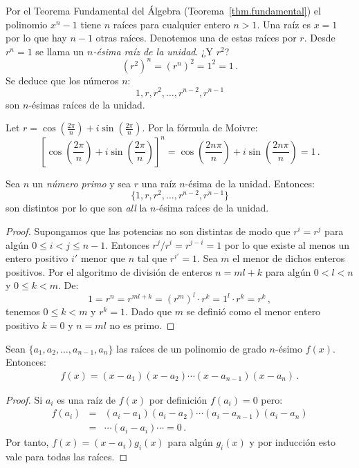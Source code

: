 Por el Teorema Fundamental del Álgebra (Teorema~\ref{thm.fundamental}) el polinomio $x^{n}-1$ tiene $n$ raíces para cualquier entero $n> 1$. Una raíz es $x=1$ por lo que hay $n-1$ otras raíces. Denotemos una de estas raíces por $r$. Desde $r^{n}=1$ se llama un \emph{$n$-ésima raíz de la unidad}. ¿Y $r^2$?
\[
(r^{2})^n=(r^{n})^2=1^2=1\,.
\]
Se deduce que los números $n$:
\[
1, r, r^2, \ldots, r^{n-2}, r^{n-1}
\]
son $n$-ésimas raíces de la unidad.

\begin{advanced}
Let $r=\cos \left(\frac{2\pi}{n}\right) + i\sin  \left(\frac{2\pi}{n}\right)$.
Por la fórmula de Moivre:
\[
\left[\cos \left(\frac{2\pi}{n}\right) + i\sin  \left(\frac{2\pi}{n}\right)\right]^{n}=
\cos \left(\frac{2 n\pi}{n}\right) + i\sin  \left(\frac{2 n\pi}{n}\right)= 1\,.
\]
\end{advanced}

\begin{theorem}
Sea $n$ un \emph{número primo} y sea $r$ una raíz $n$-ésima de la unidad. Entonces:
\[
\{1,r,r^2,\ldots,r^{n-2},r^{n-1}\}
\]
son distintos por lo que son \emph{all} la $n$-ésima raíces de la unidad.
\end{theorem}

\begin{proof}
Supongamos que las potencias no son distintas de modo que $r^i=r^j$ para algún $0\leq i<j\leq n-1$. Entonces $r^j/r^i=r^{j-i}=1$ por lo que existe al menos un entero positivo $i'$ menor que $n$ tal que $r^{i'}=1$. Sea $m$ el menor de dichos enteros positivos. Por el algoritmo de división de enteros $n=ml+k$ para algún $0<l<n$ y $0\leq k<m$. De:
\[
1=r^n=r^{ml+k}=(r^m)^l\cdot r^k=1^l\cdot r^k=r^k\,,
\]
tenemos $0\leq k<m$ y $r^k=1$. Dado que $m$ se definió como el menor entero positivo $k=0$ y $n=ml$ no es primo.
\end{proof}

\begin{theorem} Sean $\{a_1,a_2,\ldots,a_{n-1},a_n\}$ las raíces de un polinomio de grado $n$-ésimo $f(x)$. Entonces:
\begin{align}\label{eq.viete}
f(x) =(x-a_1) (x-a_2)\cdots (x-a_{n-1})(x-a_n)\,.
\end{align}
\end{theorem}

\begin{proof}
Si $a_i$ es una raíz de $f(x)$ por definición $f(a_i)=0$ pero:
\begin{eqnarray*}
f(a_i)&=&(a_i-a_1) (a_i-a_2)\cdots (a_i-a_{n-1})(a_i-a_n)\\
&=&\cdots (a_i-a_i) \cdots =0\,.
\end{eqnarray*}
Por tanto, $f(x)=(x-a_i)g_i(x)$ para algún $g_i(x)$ y por inducción esto vale para todas las raíces.
\end{proof}


